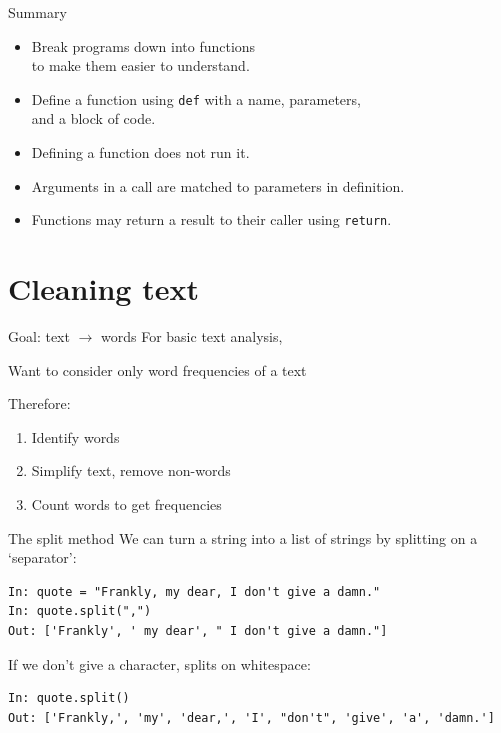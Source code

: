 \documentclass[aspectratio=169,usenames,dvipsnames]{beamer}
\begin{document}
\begin{frame}{Summary}
    \begin{itemize}
        \item Break programs down into functions \\
            to make them easier to understand.
        \item Define a function using \texttt{def} with a name, parameters,\\
            and a block of code.
        \item Defining a function does not run it.
        \item Arguments in a call are matched to parameters in definition.
        \item Functions may return a result to their caller using \texttt{return}.
    \end{itemize}
\end{frame}





\section{Cleaning text}
\frame{\tableofcontents[currentsection]}

\begin{frame}{Goal: text $\rightarrow$ words}
    For basic text analysis,

    Want to consider only word frequencies of a text

    \pause
    Therefore:
    \begin{enumerate}
        \item Identify words
        \item Simplify text, remove non-words
        \item Count words to get frequencies
    \end{enumerate}
\end{frame}


\begin{frame}[fragile]{The split method}
We can turn a string into a list of strings
by splitting on a `separator':
\begin{lstlisting}
In: quote = "Frankly, my dear, I don't give a damn."
In: quote.split(",")
Out: ['Frankly', ' my dear', " I don't give a damn."]
\end{lstlisting}

\pause
If we don't give a character, splits on whitespace:
\begin{lstlisting}
In: quote.split()
Out: ['Frankly,', 'my', 'dear,', 'I', "don't", 'give', 'a', 'damn.']
\end{lstlisting}
\end{frame}
\end{document}
